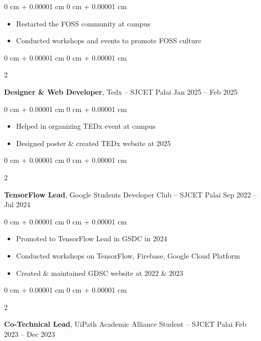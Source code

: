 \documentclass[10pt, letterpaper]{article}
\newenvironment{highlights}{
    \begin{itemize}[
        topsep=0.10 cm,
        parsep=0.10 cm,
        partopsep=0pt,
        itemsep=0pt,
        leftmargin=0 cm + 10pt
    ]
}{
    \end{itemize}
} %
\newenvironment{onecolentry}{
    \begin{adjustwidth}{
        0 cm + 0.00001 cm
    }{
        0 cm + 0.00001 cm
    }
}{
    \end{adjustwidth}
} %
\newenvironment{twocolentry}[2][]{
    \onecolentry
    \def\secondColumn{#2}
    \setcolumnwidth{\fill, 4.5 cm}
    \begin{paracol}{2}
}{
    \switchcolumn \raggedleft \secondColumn
    \end{paracol}
    \endonecolentry
} %
\begin{document}
\vspace{0.10 cm}
\begin{onecolentry}
	\begin{highlights}
		\item Restarted the FOSS community at campus
		\item Conducted workshops and events to promote FOSS culture
	\end{highlights}
\end{onecolentry}

\vspace{0.2 cm}

\begin{twocolentry}{
		Jan 2025 – Feb 2025
	}
	\textbf{Designer \& Web Developer}, Tedx -- SJCET Palai\end{twocolentry}

\vspace{0.10 cm}
\begin{onecolentry}
	\begin{highlights}
		\item Helped in organizing TEDx event at campus
		\item Designed poster \& created TEDx website at 2025
	\end{highlights}
\end{onecolentry}

\vspace{0.2 cm}

\begin{twocolentry}{
		Sep 2022 – Jul 2024
	}
	\textbf{TensorFlow Lead}, Google Students Developer Club -- SJCET Palai\end{twocolentry}

\vspace{0.10 cm}
\begin{onecolentry}
	\begin{highlights}
		\item Promoted to TensorFlow Lead in GSDC in 2024
		\item Conducted workshops on TensorFlow, Firebase, Google Cloud Platform
		\item Created \& maintained GDSC website at 2022 \& 2023
	\end{highlights}
\end{onecolentry}

\vspace{0.2 cm}

\begin{twocolentry}{
		Feb 2023 – Dec 2023
	}
	\textbf{Co-Technical Lead}, UiPath Academic Alliance Student -- SJCET Palai\end{twocolentry}
\end{document}
